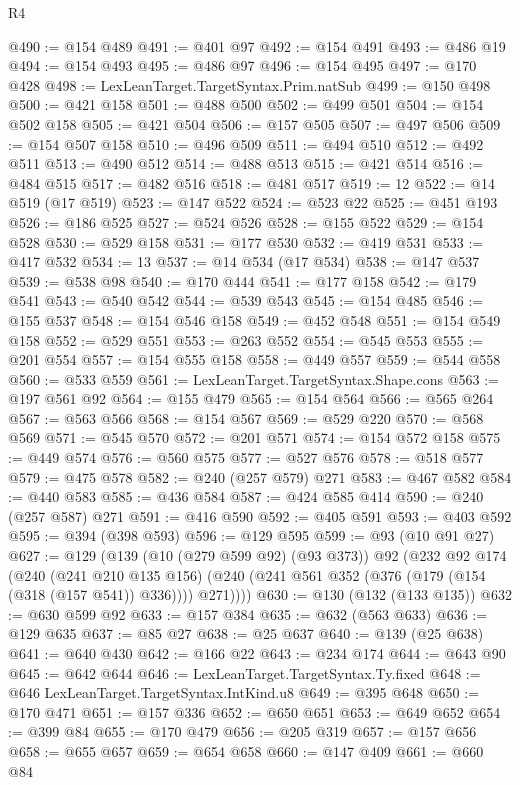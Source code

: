 \begin{lexlean}{R4}
\begin{coremodule}
@490 := @154 @489
@491 := @401 @97
@492 := @154 @491
@493 := @486 @19
@494 := @154 @493
@495 := @486 @97
@496 := @154 @495
@497 := @170 @428
@498 := LexLeanTarget.TargetSyntax.Prim.natSub
@499 := @150 @498
@500 := @421 @158
@501 := @488 @500
@502 := @499 @501
@504 := @154 @502 @158
@505 := @421 @504
@506 := @157 @505
@507 := @497 @506
@509 := @154 @507 @158
@510 := @496 @509
@511 := @494 @510
@512 := @492 @511
@513 := @490 @512
@514 := @488 @513
@515 := @421 @514
@516 := @484 @515
@517 := @482 @516
@518 := @481 @517
@519 := 12
@522 := @14 @519 (@17 @519)
@523 := @147 @522
@524 := @523 @22
@525 := @451 @193
@526 := @186 @525
@527 := @524 @526
@528 := @155 @522
@529 := @154 @528
@530 := @529 @158
@531 := @177 @530
@532 := @419 @531
@533 := @417 @532
@534 := 13
@537 := @14 @534 (@17 @534)
@538 := @147 @537
@539 := @538 @98
@540 := @170 @444
@541 := @177 @158
@542 := @179 @541
@543 := @540 @542
@544 := @539 @543
@545 := @154 @485
@546 := @155 @537
@548 := @154 @546 @158
@549 := @452 @548
@551 := @154 @549 @158
@552 := @529 @551
@553 := @263 @552
@554 := @545 @553
@555 := @201 @554
@557 := @154 @555 @158
@558 := @449 @557
@559 := @544 @558
@560 := @533 @559
@561 := LexLeanTarget.TargetSyntax.Shape.cons
@563 := @197 @561 @92
@564 := @155 @479
@565 := @154 @564
@566 := @565 @264
@567 := @563 @566
@568 := @154 @567
@569 := @529 @220
@570 := @568 @569
@571 := @545 @570
@572 := @201 @571
@574 := @154 @572 @158
@575 := @449 @574
@576 := @560 @575
@577 := @527 @576
@578 := @518 @577
@579 := @475 @578
@582 := @240 (@257 @579) @271
@583 := @467 @582
@584 := @440 @583
@585 := @436 @584
@587 := @424 @585 @414
@590 := @240 (@257 @587) @271
@591 := @416 @590
@592 := @405 @591
@593 := @403 @592
@595 := @394 (@398 @593)
@596 := @129 @595
@599 := @93 (@10 @91 @27)
@627 := @129
    (@139
      (@10 (@279 @599 @92) (@93 @373))
      @92
      (@232
        @92
        @174
        (@240
          (@241 @210 @135 @156)
          (@240 (@241 @561 @352 (@376 (@179 (@154 (@318 (@157 @541)) @336)))) @271))))
@630 := @130 (@132 (@133 @135))
@632 := @630 @599 @92
@633 := @157 @384
@635 := @632 (@563 @633)
@636 := @129 @635
@637 := @85 @27
@638 := @25 @637
@640 := @139 (@25 @638)
@641 := @640 @430
@642 := @166 @22
@643 := @234 @174
@644 := @643 @90
@645 := @642 @644
@646 := LexLeanTarget.TargetSyntax.Ty.fixed
@648 := @646 LexLeanTarget.TargetSyntax.IntKind.u8
@649 := @395 @648
@650 := @170 @471
@651 := @157 @336
@652 := @650 @651
@653 := @649 @652
@654 := @399 @84
@655 := @170 @479
@656 := @205 @319
@657 := @157 @656
@658 := @655 @657
@659 := @654 @658
@660 := @147 @409
@661 := @660 @84

\end{coremodule}
\end{lexlean}
